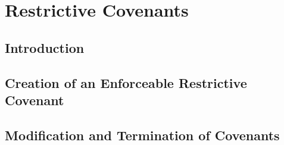 \chapter{Restrictive Covenants}


\section{Introduction}





\begin{questions}

\end{questions}



\section{Creation of an Enforceable Restrictive Covenant}






\begin{questions}

\end{questions}



\begin{questions}

\end{questions}

\section{Modification and Termination of Covenants}







\begin{questions}

\end{questions}
\endinput
